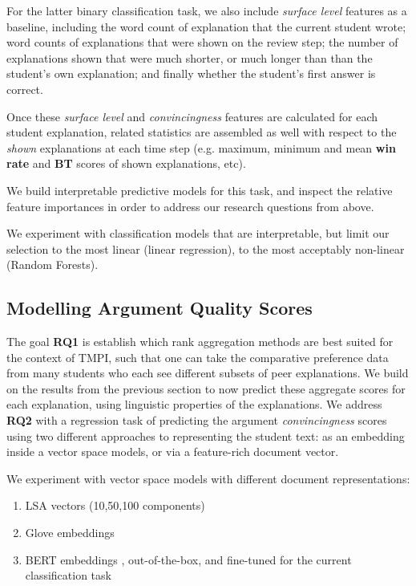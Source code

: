 \documentclass[sigconf]{acmart}
\begin{document}
For the latter binary classification task, we also include \textit{surface 
level} features as a baseline, including the word count of explanation that the 
current student wrote; word counts of explanations that were shown on the 
review step; the number of explanations shown that were much shorter, or much 
longer than than the student's own explanation; and finally whether the 
student's first answer is correct.

Once these \textit{surface level} and \textit{convincingness} features are 
calculated for each student explanation, related statistics are assembled as 
well with respect to the \textit{shown} explanations at each time step (e.g. 
maximum, minimum and mean \textbf{win rate} and \textbf{BT} scores of shown 
explanations, etc).

We build interpretable predictive models for this task, and inspect the 
relative feature importances in order to address our research questions from 
above.

We experiment with classification models that are interpretable, but limit our 
selection to the most linear (linear regression), to the most acceptably 
non-linear (Random Forests).


\subsection{Modelling Argument Quality Scores}
The goal \textbf{RQ1} is establish which rank aggregation methods are best 
suited for the context of TMPI, such that one can take the comparative 
preference data from many students who each see different subsets of peer 
explanations.
We build on the results from the previous section to now predict these 
aggregate scores for each explanation, using linguistic properties of the 
explanations.
We address \textbf{RQ2} with a regression task of predicting the argument 
\textit{convincingness} scores using two different approaches to representing 
the student text: as an embedding inside a vector space models, or via a 
feature-rich document vector.

We experiment with vector space models with different document representations:
\begin{enumerate}
	\item LSA vectors (10,50,100 components) \cite{deerwester_indexing_1990}
	\item Glove embeddings \cite{pennington_glove:_2014}
	\item BERT embeddings \cite{devlin_bert_2018}, out-of-the-box, and 
	fine-tuned for the current classification task
\end{enumerate}
\end{document}
